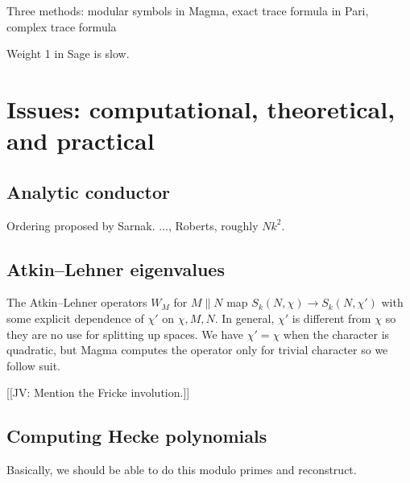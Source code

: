 \documentclass[11pt]{amsart}
\numberwithin{equation}{subsection}
\theoremstyle{plain}
\theoremstyle{definition}
\newcommand{\jv}[1]{{\color{red} \textsf{[[JV: #1]]}}}
\begin{document}
Three methods: modular symbols in Magma, exact trace formula in Pari, complex trace formula 

Weight 1 in Sage is slow.  

\section{Issues: computational, theoretical, and practical}

\subsection{Analytic conductor}

Ordering proposed by Sarnak.  ..., Roberts, roughly $Nk^2$.  

\subsection{Atkin--Lehner eigenvalues}

The Atkin--Lehner operators $W_M$ for $M \parallel N$ map $S_k(N,\chi) \to S_k(N,\chi')$ with some explicit dependence of $\chi'$ on $\chi, M, N$.  In general, $\chi'$ is different from $\chi$ so they are no use for splitting up spaces.  We have $\chi'=\chi$ when the character is quadratic, but Magma computes the operator only for trivial character so we follow suit.  

\jv{Mention the Fricke involution.}

\subsection{Computing Hecke polynomials}

Basically, we should be able to do this modulo primes and reconstruct.
\end{document}
